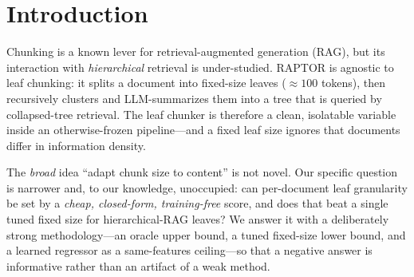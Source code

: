 \documentclass[11pt]{article}
\begin{document}
\begin{abstract}
confirms the structure axis does no harm on unstructured prose (structure-routing
rate $0$). Finally, scaling to the \emph{full} QASPER test split ($416$ papers,
$1{,}352$ questions), a held-out nested-oracle decomposition localizes the residual
headroom: a per-document leaf-size oracle \emph{underperforms} a single global size
out-of-sample ($-0.045$ coverage, $95\%$ band $[-0.060,-0.028]$), and essentially
all exploitable headroom is \emph{within-document}---it varies question-to-question
($O_4{-}O_1={+}0.135$) and concentrates in multi-evidence aggregation questions. The
negative result is therefore structural: the signal a leaf-size policy would need
lives below the document level, where no document-intrinsic feature can reach it.
This decomposition's shape replicates on QuALITY ($\mathrm{document}\le 0$, headroom
within-question), confirming it is not corpus-specific.
\end{abstract}

\section{Introduction}
\label{sec:intro}

Chunking is a known lever for retrieval-augmented generation (RAG), but its
interaction with \emph{hierarchical} retrieval is under-studied. RAPTOR
\cite{sarthi2024raptor} is agnostic to leaf chunking: it splits a document into
fixed-size leaves ($\approx 100$ tokens), then recursively clusters and
LLM-summarizes them into a tree that is queried by collapsed-tree retrieval. The
leaf chunker is therefore a clean, isolatable variable inside an otherwise-frozen
pipeline---and a fixed leaf size ignores that documents differ in information
density.

The \emph{broad} idea ``adapt chunk size to content'' is not novel. Our specific
question is narrower and, to our knowledge, unoccupied: can per-document leaf
granularity be set by a \emph{cheap, closed-form, training-free} score, and does
that beat a single tuned fixed size for hierarchical-RAG leaves? We answer it with
a deliberately strong methodology---an oracle upper bound, a tuned fixed-size
lower bound, and a learned regressor as a same-features ceiling---so that a
negative answer is informative rather than an artifact of a weak method.
\end{document}
